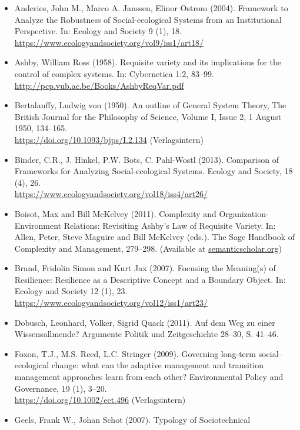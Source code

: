 \documentclass[11pt,a4paper]{article}
\begin{document}
\begin{itemize}
\item Anderies, John M., Marco A. Janssen, Elinor Ostrom (2004).  Framework to
  Analyze the Robustness of Social-ecological Systems from an Institutional
  Perspective. In: Ecology and Society 9 (1), 18.\\
  \url{https://www.ecologyandsociety.org/vol9/iss1/art18/}
\item Ashby, William Ross (1958).  Requisite variety and its implications for
  the control of complex systems. In: Cybernetica 1:2, 83--99.\\
  \url{http://pcp.vub.ac.be/Books/AshbyReqVar.pdf}
\item Bertalanffy, Ludwig von (1950). An outline of General System Theory,
  The British Journal for the Philosophy of Science, Volume I, Issue 2, 1
  August 1950, 134–165.\\ \url{https://doi.org/10.1093/bjps/I.2.134}
  (Verlagsintern) 
\item Binder, C.R., J. Hinkel, P.W. Bots, C. Pahl-Wostl (2013). Comparison of
  Frameworks for Analyzing Social-ecological Systems. Ecology and Society,
  18 (4), 26.\\ \url{https://www.ecologyandsociety.org/vol18/iss4/art26/}
\item Boisot, Max and Bill McKelvey (2011). Complexity and
  Organization-Environment Relations: Revisiting Ashby’s Law of Requisite
  Variety. In: Allen, Peter, Steve Maguire and Bill McKelvey (eds.). The Sage
  Handbook of Complexity and Management, 279--298. (Available at
 \url{semanticscholar.org})
\item Brand, Fridolin Simon and Kurt Jax (2007).  Focusing the Meaning(s) of
  Resilience: Resilience as a Descriptive Concept and a Boundary Object. In:
  Ecology and Society 12 (1), 23.
  \url{https://www.ecologyandsociety.org/vol12/iss1/art23/}
\item Dobusch, Leonhard, Volker, Sigrid Quack (2011). Auf dem Weg zu einer
  Wissensallmende? Argumente Politik und Zeitgeschichte 28--30, S. 41--46.
\item Foxon, T.J., M.S. Reed, L.C. Stringer (2009). Governing long‐term
  social–ecological change: what can the adaptive management and transition
  management approaches learn from each other? Environmental Policy and
  Governance, 19 (1), 3--20.\\ \url{https://doi.org/10.1002/eet.496}
  (Verlagsintern)
\item Geels, Frank W., Johan Schot (2007). Typology of Sociotechnical

\end{itemize}
\end{document}
